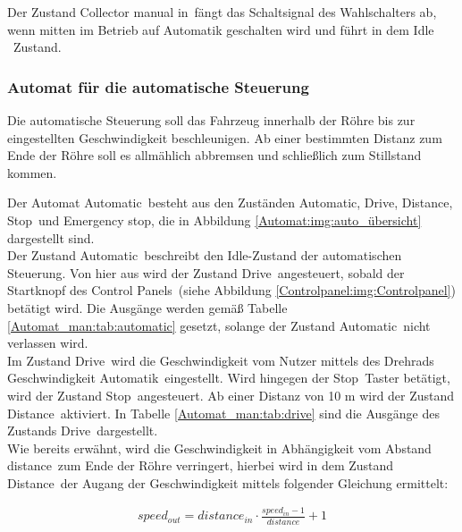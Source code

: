 Der Zustand \frqq Collector manual in\flqq\ fängt  das Schaltsignal des Wahlschalters ab, wenn mitten im Betrieb auf Automatik geschalten wird und führt in dem \frqq Idle \flqq\ Zustand.









\subsubsection{Automat für die automatische Steuerung}
\label{Automatensteuerung:Automat_auto}


Die automatische Steuerung soll das Fahrzeug innerhalb der Röhre bis zur eingestellten Geschwindigkeit beschleunigen. Ab einer bestimmten Distanz zum Ende der Röhre soll es allmählich abbremsen und schließlich zum Stillstand kommen.

Der Automat \frqq Automatic\flqq\ besteht aus den Zuständen \frqq Automatic\flqq, \frqq Drive\flqq, \frqq Distance\flqq, \frqq Stop\flqq\ und \frqq Emergency stop\flqq, die in Abbildung \ref{Automat:img:auto_übersicht} dargestellt sind.\\
Der Zustand \frqq Automatic\flqq\ beschreibt den Idle-Zustand der automatischen Steuerung. Von hier aus wird der Zustand \frqq Drive\flqq\ angesteuert, sobald der Startknopf des \frqq Control Panels\flqq\ (siehe Abbildung \ref{Controlpanel:img:Controlpanel}) betätigt wird. Die Ausgänge werden gemäß Tabelle \ref{Automat_man:tab:automatic} gesetzt, solange der Zustand \frqq Automatic\flqq\ nicht verlassen wird.\\
Im Zustand \frqq Drive\flqq\ wird die Geschwindigkeit vom Nutzer mittels des Drehrads \frqq Geschwindigkeit Automatik\flqq\ eingestellt. Wird hingegen der \frqq Stop\flqq\ Taster betätigt, wird der Zustand \frqq Stop\flqq\ angesteuert. Ab einer Distanz von 10 m wird der Zustand \frqq Distance\flqq\ aktiviert. In Tabelle \ref{Automat_man:tab:drive} sind die Ausgänge des Zustands \frqq Drive\flqq\ dargestellt.\\
Wie bereits erwähnt, wird die Geschwindigkeit in Abhängigkeit vom Abstand \frqq distance\flqq\ zum Ende der Röhre verringert, hierbei wird in dem Zustand \frqq Distance\flqq\ der Augang der Geschwindigkeit mittels folgender Gleichung ermittelt:

\pagebreak[1]
\begin{align}
	\label{eq:speedout}
	speed_{out} = distance_{in}\cdot\frac{speed_{in}-1}{distance}+1
\end{align}
\pagebreak[1]

